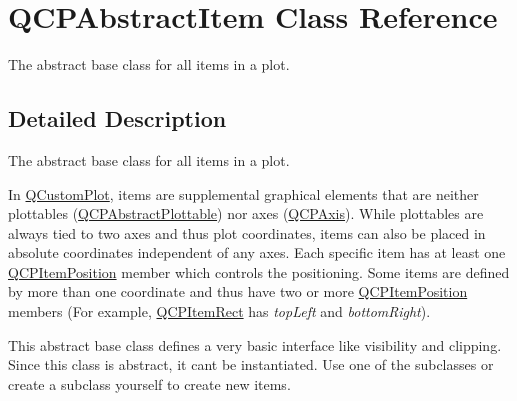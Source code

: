 \hypertarget{class_q_c_p_abstract_item}{}\section{Q\+C\+P\+Abstract\+Item Class Reference}
\label{class_q_c_p_abstract_item}


The abstract base class for all items in a plot.  




\subsection{Detailed Description}
The abstract base class for all items in a plot. 

In \mbox{\hyperlink{class_q_custom_plot}{Q\+Custom\+Plot}}, items are supplemental graphical elements that are neither plottables (\mbox{\hyperlink{class_q_c_p_abstract_plottable}{Q\+C\+P\+Abstract\+Plottable}}) nor axes (\mbox{\hyperlink{class_q_c_p_axis}{Q\+C\+P\+Axis}}). While plottables are always tied to two axes and thus plot coordinates, items can also be placed in absolute coordinates independent of any axes. Each specific item has at least one \mbox{\hyperlink{class_q_c_p_item_position}{Q\+C\+P\+Item\+Position}} member which controls the positioning. Some items are defined by more than one coordinate and thus have two or more \mbox{\hyperlink{class_q_c_p_item_position}{Q\+C\+P\+Item\+Position}} members (For example, \mbox{\hyperlink{class_q_c_p_item_rect}{Q\+C\+P\+Item\+Rect}} has {\itshape top\+Left} and {\itshape bottom\+Right}).

This abstract base class defines a very basic interface like visibility and clipping. Since this class is abstract, it can\textquotesingle{}t be instantiated. Use one of the subclasses or create a subclass yourself to create new items.

